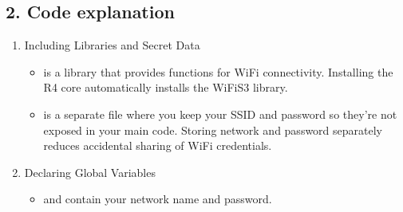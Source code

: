 \documentclass[a4paper,11pt,english]{sphinxmanual}
\begin{document}
\subsection{2. Code explanation}
\label{\detokenize{Extension_Project/WiFi_Connect_Test:code-explanation}}\begin{enumerate}
%
\item {} 
\sphinxAtStartPar
Including Libraries and Secret Data

\begin{sphinxVerbatim}[commandchars=\\\{\}]
\end{sphinxVerbatim}
\begin{itemize}
\item {} 
\sphinxAtStartPar
{} is a library that provides functions for Wi\sphinxhyphen{}Fi connectivity. Installing the R4 core automatically installs the WiFiS3 library.

\item {} 
\sphinxAtStartPar
{} is a separate file where you keep your SSID and password so they’re not exposed in your main code. Storing network and password separately reduces accidental sharing of Wi\sphinxhyphen{}Fi credentials.

\end{itemize}



\item {} 
\sphinxAtStartPar
Declaring Global Variables

\begin{sphinxVerbatim}[commandchars=\\\{\}]
\PYG{p}{[}\PYG{p}{]}
\PYG{p}{[}\PYG{p}{]}
\end{sphinxVerbatim}
\begin{itemize}
\item {} 
\sphinxAtStartPar
{} and  contain your network name and password.


\end{itemize}
\end{enumerate}
\end{document}
